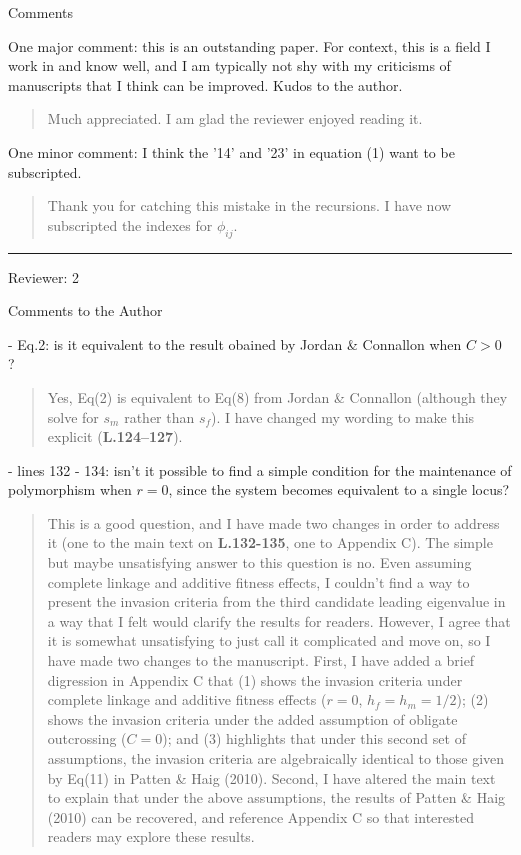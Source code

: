 \documentclass[11pt]{article}
\begin{document}
\noindent Comments
\bigskip

\noindent One major comment: this is an outstanding paper. For context, this is a field I work in and know well, and I am typically not shy with my criticisms of manuscripts that I think can be improved. Kudos to the author.

	\begin{quote}
		Much appreciated. I am glad the reviewer enjoyed reading it.
	\end{quote}

\noindent One minor comment: I think the '14' and '23' in equation (1) want to be subscripted.

	\begin{quote}
		Thank you for catching this mistake in the recursions. I have now subscripted the indexes for $\phi_{ij}$.
	\end{quote}



\bigskip
\noindent \rule{8cm}{0.4pt}
\bigskip



\noindent Reviewer: 2
\bigskip

\noindent Comments to the Author
\bigskip

 - Eq.2: is it equivalent to the result obained by Jordan \& Connallon when $C > 0$ ?

	\begin{quote}
		Yes, Eq(2) is equivalent to Eq(8) from Jordan \& Connallon (although they solve for $s_m$ rather than $s_f$). I have changed my wording to make this explicit (\textbf{L.124--127}).
	\end{quote}

 - lines 132 - 134: isn't it possible to find a simple condition for the maintenance of polymorphism when $r=0$, since the system becomes equivalent to a single locus?

	\begin{quote}
		This is a good question, and I have made two changes in order to address it (one to the main text on \textbf{L.132-135}, one to Appendix C). The simple but maybe unsatisfying answer to this question is no. Even assuming complete linkage and additive fitness effects, I couldn't find a way to present the invasion criteria from the third candidate leading eigenvalue in a way that I felt would clarify the results for readers. However, I agree that it is somewhat unsatisfying to just call it complicated and move on, so I have made two changes to the manuscript. First, I have added a brief digression in Appendix C that (1) shows the invasion criteria under complete linkage and additive fitness effects ($r=0$, $h_f=h_m=1/2$); (2) shows the invasion criteria under the added assumption of obligate outcrossing ($C=0$); and (3) highlights that under this second set of assumptions, the invasion criteria are algebraically identical to those given by Eq(11) in Patten \& Haig (2010). Second, I have altered the main text to explain that under the above assumptions, the results of Patten \& Haig (2010) can be recovered, and reference Appendix C so that interested readers may explore these results.
	\end{quote}
\end{document}
